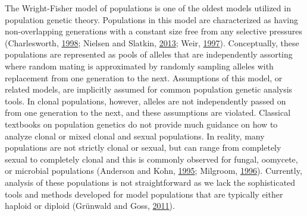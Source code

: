 \documentclass[double,12pt]{beavtex}
\begin{document}
  The Wright-Fisher model of populations is one of the oldest models
  utilized in population genetic theory. Populations in this model are
  characterized as having non-overlapping generations with a constant size
  free from any selective pressures (Charlesworth,
  \protect\hyperlink{ref-Charlesworth_1998}{1998}; Nielsen and Slatkin,
  \protect\hyperlink{ref-nielsen2013introduction}{2013}; Weir,
  \protect\hyperlink{ref-Weir_1997}{1997}). Conceptually, these
  populations are represented as pools of alleles that are independently
  assorting where random mating is approximated by randomly sampling
  alleles with replacement from one generation to the next. Assumptions of
  this model, or related models, are implicitly assumed for common
  population genetic analysis tools. In clonal populations, however,
  alleles are not independently passed on from one generation to the next,
  and these assumptions are violated. Classical textbooks on population
  genetics do not provide much guidance on how to analyze clonal or mixed
  clonal and sexual populations. In reality, many populations are not
  strictly clonal or sexual, but can range from completely sexual to
  completely clonal and this is commonly observed for fungal, oomycete, or
  microbial populations (Anderson and Kohn,
  \protect\hyperlink{ref-anderson1995clonality}{1995}; Milgroom,
  \protect\hyperlink{ref-milgroom1996recombination}{1996}). Currently,
  analysis of these populations is not straightforward as we lack the
  sophisticated tools and methods developed for model populations that are
  typically either haploid or diploid (Grünwald and Goss,
  \protect\hyperlink{ref-grunwald2011evolution}{2011}).
  
\end{document}
